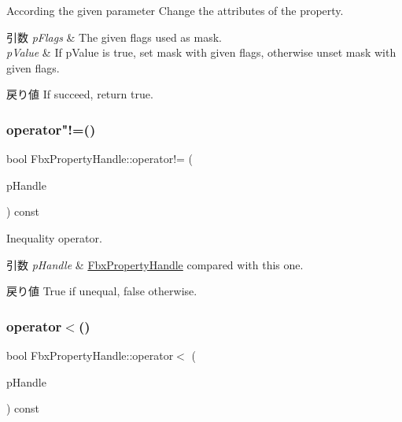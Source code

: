According the given parameter Change the attributes of the property. 
\begin{DoxyParams}{引数}
{\em p\+Flags} & The given flags used as mask. \\
\hline
{\em p\+Value} & If p\+Value is true, set mask with given flags, otherwise unset mask with given flags. \\
\hline
\end{DoxyParams}
\begin{DoxyReturn}{戻り値}
If succeed, return true. 
\end{DoxyReturn}
\mbox{\label{class_fbx_property_handle_a551b2ce6d554279f23f11a1a1bbdc935}} 
\subsubsection{\texorpdfstring{operator"!=()}{operator!=()}}
{\footnotesize\ttfamily bool Fbx\+Property\+Handle\+::operator!= (\begin{DoxyParamCaption}\item[{const \hyperlink{class_fbx_property_handle}{Fbx\+Property\+Handle} \&}]{p\+Handle }\end{DoxyParamCaption}) const}

Inequality operator. 
\begin{DoxyParams}{引数}
{\em p\+Handle} & \hyperlink{class_fbx_property_handle}{Fbx\+Property\+Handle} compared with this one. \\
\hline
\end{DoxyParams}
\begin{DoxyReturn}{戻り値}
{\ttfamily True} if unequal, {\ttfamily false} otherwise. 
\end{DoxyReturn}
\mbox{\label{class_fbx_property_handle_a6035a62865028477a5352726c6682f79}} 
\subsubsection{\texorpdfstring{operator$<$()}{operator<()}}
{\footnotesize\ttfamily bool Fbx\+Property\+Handle\+::operator$<$ (\begin{DoxyParamCaption}\item[{const \hyperlink{class_fbx_property_handle}{Fbx\+Property\+Handle} \&}]{p\+Handle }\end{DoxyParamCaption}) const}

